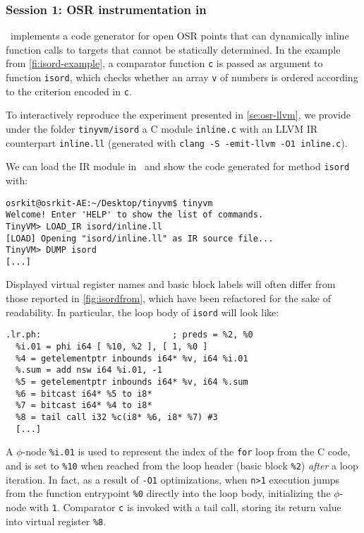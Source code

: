 
\subsubsection{Session 1: OSR instrumentation in \osrkit}

\tinyvm\ implements a code generator for open OSR points that can dynamically inline function calls to targets that cannot be statically determined. In the example from \myfigure\ref{fi:isord-example}, a comparator function {\tt c} is passed as argument to function {\tt isord}, which checks whether an array {\tt v} of numbers is ordered according to the criterion encoded in {\tt c}.

To interactively reproduce the experiment presented in \mysection\ref{se:osr-llvm}, we provide under the folder {\small\tt tinyvm/isord} a C module {\small\tt inline.c} with an LLVM IR counterpart {\small\tt inline.ll} (generated with {\small\tt clang -S -emit-llvm -O1 inline.c}).

\vspace{0.2em}
We can load the IR module in \tinyvm\ and show the code generated for method {\tt isord} with:
\begin{small}
\begin{verbatim}
osrkit@osrkit-AE:~/Desktop/tinyvm$ tinyvm
Welcome! Enter 'HELP' to show the list of commands.
TinyVM> LOAD_IR isord/inline.ll
[LOAD] Opening "isord/inline.ll" as IR source file...
TinyVM> DUMP isord
[...]
\end{verbatim}
\end{small}

\noindent Displayed virtual register names and basic block labels will often differ from those reported in \myfigure\ref{fig:isordfrom}, which have been refactored for the sake of readability. In particular, the loop body of {\tt isord} will look like:

\begin{small}
\begin{verbatim}
.lr.ph:                          ; preds = %2, %0
  %i.01 = phi i64 [ %10, %2 ], [ 1, %0 ]
  %4 = getelementptr inbounds i64* %v, i64 %i.01
  %.sum = add nsw i64 %i.01, -1
  %5 = getelementptr inbounds i64* %v, i64 %.sum
  %6 = bitcast i64* %5 to i8*
  %7 = bitcast i64* %4 to i8*
  %8 = tail call i32 %c(i8* %6, i8* %7) #3
  [...]
\end{verbatim}
\end{small}

\noindent A $\phi$-node {\tt \%i.01} is used to represent the index of the {\tt for} loop from the C code, and is set to {\tt \%10} when reached from the loop header (basic block {\tt \%2}) {\em after} a loop iteration. In fact, as a result of {\small \tt -O1} optimizations, when {\tt n>1} execution jumps from the function entrypoint {\tt \%0} directly into the loop body, initializing the $\phi$-node with {\tt 1}. Comparator {\tt c} is invoked with a tail call, storing its return value into virtual register {\tt \%8}.


